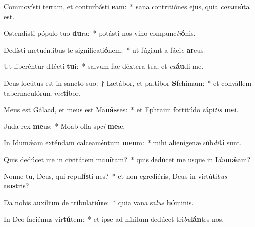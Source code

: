 \item Commovísti terram, et conturbásti \textbf{e}am:~* sana contritiónes ejus, quia \textit{com}\textbf{mó}ta est.
\item Ostendísti pópulo tuo \textbf{du}ra:~* potásti nos vino compunc\textit{ti}\textbf{ó}nis.
\item Dedísti metuéntibus te significati\textbf{ó}nem:~* ut fúgiant a fáci\textit{e} \textbf{ar}cus:
\item Ut liberéntur dilécti \textbf{tu}i:~* salvum fac déxtera tua, et \textit{ex}\textbf{áu}di me.
\item Deus locútus est in sancto suo:~† Lætábor, et partíbor \textbf{Sí}chimam:~* et convállem tabernaculórum \textit{me}\textbf{tí}bor.
\item Meus est Gálaad, et meus est Ma\textbf{nás}ses:~* et Ephraim fortitúdo cápi\textit{tis} \textbf{me}i.
\item Juda rex \textbf{me}us:~* Moab olla spe\textit{i} \textbf{me}æ.
\item In Idumǽam exténdam calceaméntum \textbf{me}um:~* mihi alienígenæ súb\textit{di}\textbf{ti} sunt.
\item Quis dedúcet me in civitátem mu\textbf{ní}tam?~* quis dedúcet me usque in I\textit{du}\textbf{mǽ}am?
\item Nonne tu, Deus, qui repu\textbf{lís}ti nos?~* et non egrediéris, Deus in virtúti\textit{bus} \textbf{nos}tris?
\item Da nobis auxílium de tribulati\textbf{ó}ne:~* quia vana sa\textit{lus} \textbf{hó}minis.
\item In Deo faciémus vir\textbf{tú}tem:~* et ipse ad níhilum dedúcet tri\textit{bu}\textbf{lán}tes nos.
